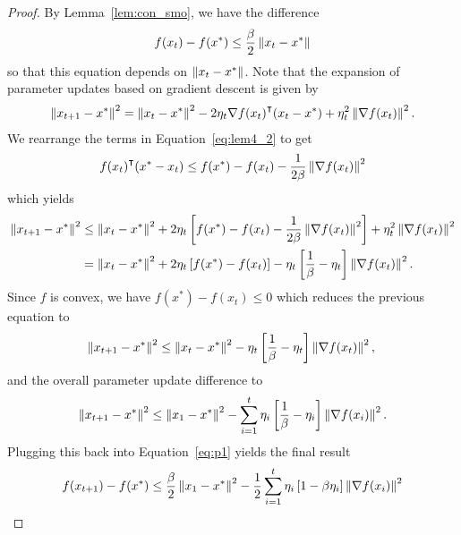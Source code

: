 \begin{proof}
    By Lemma~\ref{lem:con_smo}, we have the difference 
    \begin{equation}
        \label{eq:p1}
        f(x_t) - f(x^*) \leq \frac{\beta}{2}\left\| x_t - x^* \right\|
    \end{equation}
    so that this equation depends on $\left\| x_t - x^* \right\|$. 
    Note that the expansion of parameter updates based on gradient descent is
    given by
    \begin{equation}
        \begin{aligned}
            \left\| x_{t + 1} - x^* \right\|^2 &= \left\| x_t - x^* \right\|^2 - 2\eta_t {\nabla
            f(x_t)}^\intercal (x_t - x^*) + \eta_t^2 \left\| \nabla f(x_t) \right\|^2. \\
        \end{aligned}
    \end{equation}
    We rearrange the terms in Equation~\ref{eq:lem4_2} to get 
    \begin{equation}
        {f(x_t)}^\intercal (x^* - x_t) \leq f(x^*) - f(x_t) -
        \frac{1}{2\beta}\left\| \nabla f(x_t) \right\|^2
    \end{equation}
    which yields
    \begin{equation}
        \begin{aligned}
            \left\| x_{t + 1} - x^* \right\|^2 &\leq \left\| x_t - x^* \right\|^2 + 2\eta_t \left[ f(x^*) - f(x_t) - \frac{1}{2\beta}\left\| \nabla f(x_t) \right\|^2\right] + \eta_t^2 \left\| \nabla f(x_t) \right\|^2 \\
            &= \left\| x_t - x^* \right\|^2 + 2\eta_t \left[ f(x^*) - f(x_t)\right] -
            \eta_t\left[\frac{1}{\beta} - \eta_t\right] \left\| \nabla f(x_t) \right\|^2. \\
        \end{aligned}
    \end{equation}
    Since $f$ is convex, we have $f(x^*) - f(x_t) \leq 0$ which reduces the
    previous equation to 
    \begin{equation}
            \left\| x_{t + 1} - x^* \right\|^2 \leq  \left\| x_t - x^* \right\|^2  -
            \eta_t\left[\frac{1}{\beta} - \eta_t\right] \left\| \nabla f(x_t) \right\|^2, \\
    \end{equation}
    and the overall parameter update difference to
    \begin{equation}
        \left\| x_{t + 1} - x^* \right\|^2 \leq  \left\| x_1 - x^* \right\|^2 - \sum_{i = 1}^t  \eta_i\left[\frac{1}{\beta} - \eta_i\right] \left\| \nabla f(x_i) \right\|^2. \\
    \end{equation}
    Plugging this back into Equation~\ref{eq:p1} yields the final result
    \begin{equation}
        f(x_{t+1}) - f(x^*) \leq \frac{\beta}{2}\left\| x_1 - x^* \right\|^2 - \frac 1 2\sum_{i =
        1}^{t}  \eta_i\left[1 - \beta\eta_i\right] \left\| \nabla f(x_i) \right\|^2
    \end{equation}
\end{proof}


